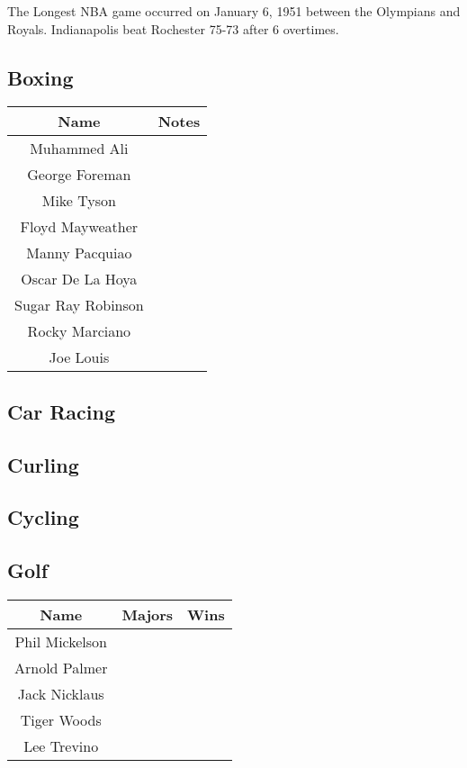 			The Longest NBA game occurred on January 6, 1951 between the Olympians and Royals. Indianapolis beat Rochester 75-73 after 6 overtimes.
			
			
		
		\newpage		
		\subsection{Boxing}
		\begin{tabular}{|c|c|}
				\hline
			\textbf{Name} & \textbf{Notes} \\
			\hline
			Muhammed Ali &   \\
			\hline
			George Foreman  & \\
			\hline
			Mike Tyson & \\
			\hline
			Floyd Mayweather &  \\
			\hline
			Manny Pacquiao &  \\
			\hline
			Oscar De La Hoya & \\
			\hline
			Sugar Ray Robinson & \\
			\hline
			Rocky Marciano & \\
			\hline
			Joe Louis & \\
			\hline
			
			
			\hline
		\end{tabular}

		\subsection{Car Racing}
		
		\subsection{Curling}
		\subsection{Cycling}
		\subsection{Golf}
			\begin{tabular}{|c|c|c|}
				\hline
				\textbf{Name} & \textbf{Majors} & \textbf{Wins} \\
				\hline
				Phil Mickelson & &  \\
				\hline
				Arnold Palmer & & \\
				\hline
				Jack Nicklaus & & \\
				\hline
				Tiger Woods & & \\
				\hline
				Lee Trevino & & \\
				
				\hline
				
			\end{tabular}
				
